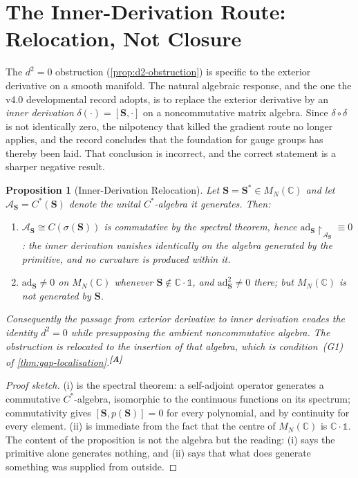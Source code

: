 \documentclass[12pt,a4paper,twoside]{article}
\theoremstyle{plain}
\newtheorem{proposition}[theorem]{Proposition}
\theoremstyle{definition}
\theoremstyle{remark}
\newcommand{\catmark}[1]{\textsuperscript{\textsf{\textbf{[#1]}}}}
\begin{document}
\section{The Inner-Derivation Route: Relocation, Not Closure}
\label{sec:inner-derivation}

\noindent The $d^2 = 0$ obstruction (\cref{prop:d2-obstruction}) is
specific to the exterior derivative on a smooth manifold. The natural
algebraic response, and the one the v4.0 developmental record adopts, is
to replace the exterior derivative by an \emph{inner derivation}
$\delta(\cdot) = [\mathbf S, \cdot]$ on a noncommutative matrix algebra.
Since $\delta \circ \delta$ is not identically zero, the nilpotency that
killed the gradient route no longer applies, and the record concludes
that the foundation for gauge groups has thereby been laid. That
conclusion is incorrect, and the correct statement is a sharper negative
result.

\begin{proposition}[Inner-Derivation Relocation]
\label{prop:inner-derivation}
Let $\mathbf S = \mathbf S^{\ast} \in M_N(\mathbb C)$ and let
$\mathcal A_{\mathbf S} = C^{\ast}(\mathbf S)$ denote the unital
$C^{\ast}$-algebra it generates. Then:
\begin{enumerate}[label=(\roman*),leftmargin=2.2em,itemsep=0.15em]
\item $\mathcal A_{\mathbf S} \cong C(\sigma(\mathbf S))$ is commutative
by the spectral theorem, hence $\mathrm{ad}_{\mathbf
S}\!\restriction_{\mathcal A_{\mathbf S}} \equiv 0$: the inner derivation
vanishes identically on the algebra generated by the primitive, and no
curvature is produced within it.
\item $\mathrm{ad}_{\mathbf S} \neq 0$ on $M_N(\mathbb C)$ whenever
$\mathbf S \notin \mathbb C\!\cdot\!\mathbb 1$, and
$\mathrm{ad}_{\mathbf S}^{2} \neq 0$ there; but $M_N(\mathbb C)$ is not
generated by $\mathbf S$.
\end{enumerate}
Consequently the passage from exterior derivative to inner derivation
evades the identity $d^2=0$ while presupposing the ambient noncommutative
algebra. The obstruction is relocated to the insertion of that algebra,
which is condition~(G1) of \cref{thm:gap-localisation}.\catmark{A}
\end{proposition}

\begin{proof}[Proof sketch]
(i) is the spectral theorem: a self-adjoint operator generates a
commutative $C^{\ast}$-algebra, isomorphic to the continuous functions on
its spectrum; commutativity gives $[\mathbf S, p(\mathbf S)] = 0$ for
every polynomial, and by continuity for every element. (ii) is immediate
from the fact that the centre of $M_N(\mathbb C)$ is $\mathbb
C\!\cdot\!\mathbb 1$. The content of the proposition is not the algebra
but the reading: (i) says the primitive alone generates nothing, and (ii)
says that what does generate something was supplied from outside.
\end{proof}
\end{document}
